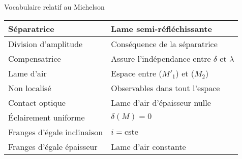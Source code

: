 \documentclass[french, a4paper, 11pt, twocolumn]{article}
\begin{document}
\begin{cadre}{Vocabulaire relatif au Michelson}
  \begin{tabularx}{\linewidth}{X|X}
    Séparatrice & Lame semi-réfléchissante \\
    \hline
    Division d'amplitude & Conséquence de la séparatrice \\
    \hline
    Compensatrice & Assure l'indépendance entre \(\delta\) et \(\lambda\) \\
    \hline
    Lame d'air & Espace entre (\(M'_1\)) et (\(M_2\)) \\
    \hline
    Non localisé & Observables dans tout l'espace \\
    \hline
    Contact optique & Lame d'air d'épaisseur nulle \\
    \hline
    Éclairement uniforme & \(\delta(M)=0\) \\
    \hline
    Franges d'égale inclinaison& \(i=\mathrm{cste}\)\\
    \hline
    Franges d'égale épaisseur & Lame d'air constante
  \end{tabularx}
\end{cadre}
\end{document}
